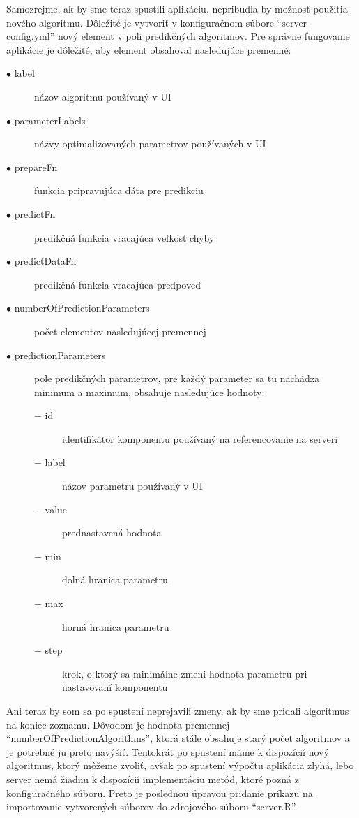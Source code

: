 \documentclass[a4paper,slovak,12pt,appendix]{article}
\begin{document}
Samozrejme, ak by sme teraz spustili aplikáciu, nepribudla by možnosť použitia
nového algoritmu. Dôležité je vytvoriť v konfiguračnom súbore
``server-config.yml'' nový element v poli predikčných algoritmov. Pre správne
fungovanie aplikácie je dôležité, aby element obsahoval nasledujúce premenné:

\begin{description}
  \item[$\bullet$ label] názov algoritmu používaný v UI
  \item[$\bullet$ parameterLabels] názvy optimalizovaných parametrov používaných v UI
  \item[$\bullet$ prepareFn] funkcia pripravujúca dáta pre predikciu
  \item[$\bullet$ predictFn] predikčná funkcia vracajúca veľkosť chyby
  \item[$\bullet$ predictDataFn] predikčná funkcia vracajúca predpoveď
  \item[$\bullet$ numberOfPredictionParameters] počet elementov nasledujúcej premennej
  \item[$\bullet$ predictionParameters] pole predikčných parametrov, pre každý parameter sa
  tu nachádza minimum a maximum, obsahuje nasledujúce hodnoty:
  \begin{description}
    \item[$-$ id] identifikátor komponentu používaný na referencovanie na serveri
    \item[$-$ label] názov parametru používaný v UI
    \item[$-$ value] prednastavená hodnota
    \item[$-$ min] dolná hranica parametru
    \item[$-$ max] horná hranica parametru
    \item[$-$ step] krok, o ktorý sa minimálne zmení hodnota parametru pri nastavovaní komponentu
  \end{description}
\end{description}

Ani teraz by som sa po spustení neprejavili zmeny, ak by sme pridali algoritmus
na koniec zoznamu. Dôvodom je hodnota premennej ``numberOfPredictionAlgorithms'',
ktorá stále obsahuje starý počet algoritmov a je potrebné ju preto navýšiť.
Tentokrát po spustení máme k dispozícií nový algoritmus, ktorý môžeme zvoliť,
avšak po spustení výpočtu aplikácia zlyhá, lebo server nemá žiadnu k dispozícií
implementáciu metód, ktoré pozná z konfiguračného súboru. Preto je poslednou
úpravou pridanie príkazu na importovanie vytvorených súborov do zdrojového
súboru ``server.R''.
\end{document}
